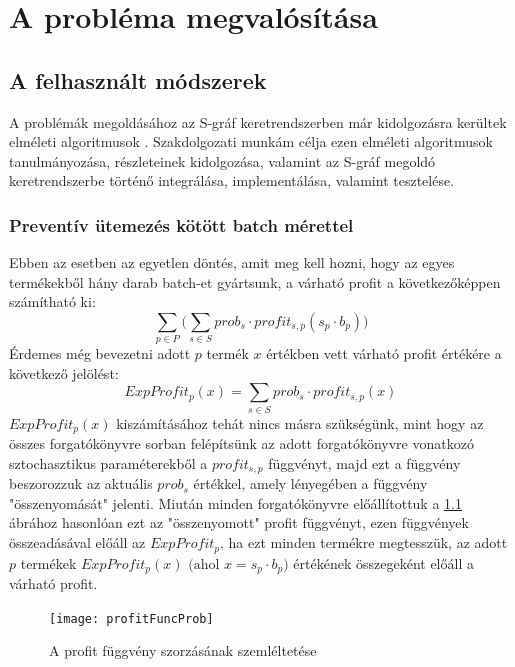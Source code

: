 \chapter{A probléma megvalósítása}
\section{A felhasznált módszerek} \label{math_modells}
A problémák megoldásához az S-gráf keretrendszerben már kidolgozásra kerültek elméleti algoritmusok \cite{phd_Hegyhati}.
Szakdolgozati munkám célja ezen elméleti algoritmusok tanulmányozása, részleteinek kidolgozása, valamint az S-gráf megoldó keretrendszerbe történő integrálása, implementálása, valamint tesztelése.
\subsection{Preventív ütemezés kötött batch mérettel} \label{FixBatchSize}
Ebben az esetben az egyetlen döntés, amit meg kell hozni, hogy az egyes termékekből hány darab batch-et gyártsunk, a várható profit a következőképpen számítható ki:
$$\sum_{p \in P}\bigg (\sum_{s \in S} prob_s \cdot profit_{s,p} (s_p \cdot b_p)\bigg)$$
Érdemes még bevezetni adott $p$ termék $x$ értékben vett várható profit értékére a következő jelölést:
$$ExpProfit_p(x)=\sum_{s \in S}prob_s \cdot profit_{s,p}(x)$$
$ExpProfit_p(x)$ kiszámításához tehát nincs másra szükségünk, mint hogy az összes forgatókönyvre sorban felépítsünk az adott forgatókönyvre vonatkozó sztochasztikus paraméterekből a $profit_{s,p}$ függvényt, majd ezt a függvény beszorozzuk az aktuális $prob_s$ értékkel, amely lényegében a függvény "összenyomását" jelenti. 
Miután minden forgatókönyvre előállítottuk a \ref{profit_func_prob} ábrához hasonlóan ezt az "összenyomott" profit függvényt, ezen függvények összeadásával előáll az $ExpProfit_p$, ha ezt minden termékre megtesszük, az adott $p$ termékek $ExpProfit_p(x) \text{ (ahol }x=s_p \cdot b_p)$ értékének összegeként előáll a várható profit.
\begin{figure}[H]
\begin{center}
\texttt{[image: profitFuncProb]}
\caption{A profit függvény szorzásának szemléltetése}
\label{profit_func_prob}
\end{center}
\end{figure}
